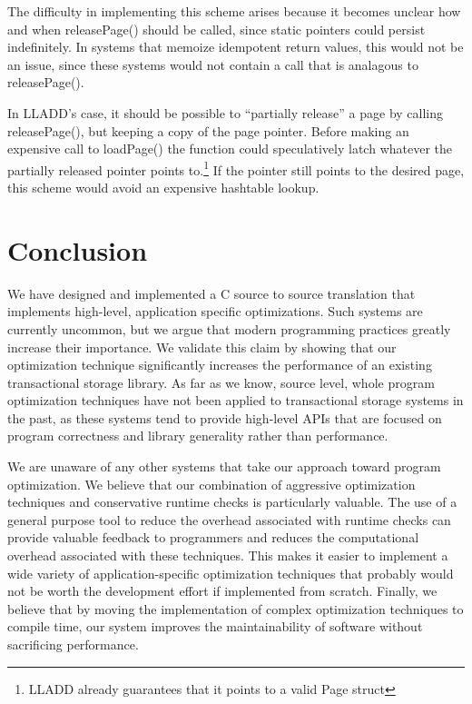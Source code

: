 \documentclass[10pt,letterpaper,twocolumn,english]{article}
\newcommand{\yad}{LLADD\xspace}
\newcommand{\pin}{loadPage()\xspace}
\newcommand{\unpin}{releasePage()\xspace}
\begin{document}
The difficulty in implementing this scheme arises because it becomes
unclear how and when \unpin should be called, since static pointers
could persist indefinitely.  In systems that
memoize idempotent return values, this would not be an issue, since
these systems would not contain a call that is analagous to \unpin.

In \yad's case, it should be possible to ``partially release'' a page by
calling \unpin, but keeping a copy of the page pointer.  Before making
an expensive call to \pin the function could speculatively latch
whatever the partially released pointer points
to.\footnote{\yad already guarantees that it points to a valid Page
struct} If the pointer still points to the desired page, this
scheme would avoid an expensive hashtable lookup.

\section{Conclusion}

We have designed and implemented a C source to source translation that
implements high-level, application specific optimizations.  Such
systems are currently uncommon, but we argue that modern programming
practices greatly increase their importance.  We validate this claim
by showing that our optimization technique significantly increases the
performance of an existing transactional storage library.  As far as
we know, source level, whole program optimization techniques have not
been applied to transactional storage systems in the past, as these
systems tend to provide high-level APIs that are focused on program 
correctness and library generality rather than performance.
 
We are unaware of any other
systems that take our approach toward program optimization.  We
believe that our combination of aggressive optimization techniques
and conservative runtime checks is particularly valuable.  The use of
a general purpose tool to reduce the overhead associated with runtime
checks can provide valuable feedback to programmers and reduces the 
computational overhead associated with these techniques.  This
makes it easier to implement a wide variety of application-specific
optimization techniques that probably would not be worth the
development effort if implemented from scratch.  Finally, we believe
that by moving the implementation of complex optimization techniques
to compile time, our system improves the maintainability of software
without sacrificing performance.
\end{document}
